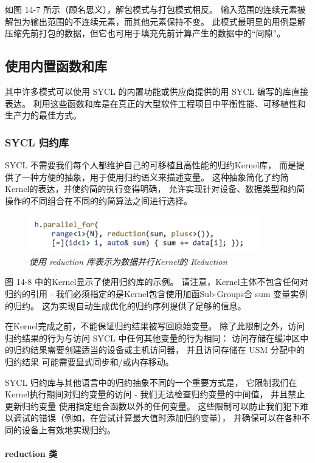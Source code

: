 如图 14-7 所示（顾名思义），解包模式与打包模式相反。 
输入范围的连续元素被解包为输出范围的不连续元素，而其他元素保持不变。 
此模式最明显的用例是解压缩先前打包的数据，但它也可用于填充先前计算产生的数据中的“间隙”。

\subsection{使用内置函数和库}
其中许多模式可以使用 SYCL 的内置功能或供应商提供的用 SYCL 编写的库直接表达。 
利用这些函数和库是在真正的大型软件工程项目中平衡性能、可移植性和生产力的最佳方式。

\subsubsection{SYCL 归约库}
SYCL 不需要我们每个人都维护自己的可移植且高性能的归约Kernel库，
而是提供了一种方便的抽象，用于使用归约语义来描述变量。 
这种抽象简化了约简Kernel的表达，并使约简的执行变得明确，
允许实现针对设备、数据类型和约简操作的不同组合在不同的约简算法之间进行选择。

\begin{figure}[H]
	\centering
	\includegraphics[width=0.9\textwidth]{figs/F14.8.png}
	\caption{\textit{使用 reduction 库表示为数据并行Kernel的 Reduction }}
\end{figure}

图 14-8 中的Kernel显示了使用归约库的示例。 
请注意，Kernel主体不包含任何对归约的引用 - 我们必须指定的是Kernel包含使用加函Sub-Groups合 sum 变量实例的归约。 
这为实现自动生成优化的归约序列提供了足够的信息。

在Kernel完成之前，不能保证归约结果被写回原始变量。 
除了此限制之外，访问归约结果的行为与访问 SYCL 中任何其他变量的行为相同：
访问存储在缓冲区中的归约结果需要创建适当的设备或主机访问器，
并且访问存储在 USM 分配中的归约结果 可能需要显式同步和/或内存移动。

SYCL 归约库与其他语言中的归约抽象不同的一个重要方式是，
它限制我们在Kernel执行期间对归约变量的访问 - 我们无法检查归约变量的中间值，
并且禁止更新归约变量 使用指定组合函数以外的任何变量。 
这些限制可以防止我们犯下难以调试的错误（例如，在尝试计算最大值时添加归约变量），
并确保可以在各种不同的设备上有效地实现归约。

\paragraph{reduction 类}


